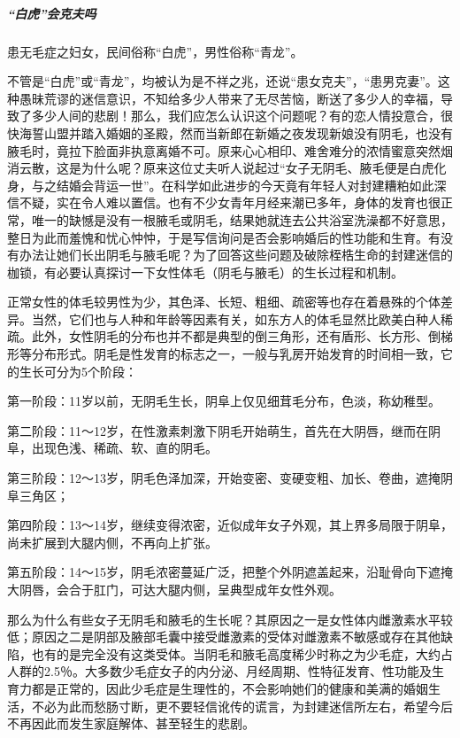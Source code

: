 \begin{enumerate}
\subparagraph{“白虎”会克夫吗}

患无毛症之妇女，民间俗称“白虎”，男性俗称“青龙”。

不管是“白虎”或“青龙”，均被认为是不祥之兆，还说“患女克夫”，“患男克妻”。这种愚昧荒谬的迷信意识，不知给多少人带来了无尽苦恼，断送了多少人的幸福，导致了多少人间的悲剧！那么，我们应怎么认识这个问题呢？有的恋人情投意合，很快海誓山盟并踏入婚姻的圣殿，然而当新郎在新婚之夜发现新娘没有阴毛，也没有腋毛时，竟拉下脸面非执意离婚不可。原来心心相印、难舍难分的浓情蜜意突然烟消云散，这是为什么呢？原来这位丈夫听人说起过“女子无阴毛、腋毛便是白虎化身，与之结婚会背运一世”。在科学如此进步的今天竟有年轻人对封建糟粕如此深信不疑，实在令人难以置信。也有不少女青年月经来潮已多年，身体的发育也很正常，唯一的缺憾是没有一根腋毛或阴毛，结果她就连去公共浴室洗澡都不好意思，整日为此而羞愧和忧心忡忡，于是写信询问是否会影响婚后的性功能和生育。有没有办法让她们长出阴毛与腋毛呢？为了回答这些问题及破除桎梏生命的封建迷信的枷锁，有必要认真探讨一下女性体毛（阴毛与腋毛）的生长过程和机制。

正常女性的体毛较男性为少，其色泽、长短、粗细、疏密等也存在着悬殊的个体差异。当然，它们也与人种和年龄等因素有关，如东方人的体毛显然比欧美白种人稀疏。此外，女性阴毛的分布也并不都是典型的倒三角形，还有盾形、长方形、倒梯形等分布形式。阴毛是性发育的标志之一，一般与乳房开始发育的时间相一致，它的生长可分为5个阶段：

第一阶段：11岁以前，无阴毛生长，阴阜上仅见细茸毛分布，色淡，称幼稚型。

第二阶段：11～12岁，在性激素刺激下阴毛开始萌生，首先在大阴唇，继而在阴阜，出现色浅、稀疏、软、直的阴毛。

第三阶段：12～13岁，阴毛色泽加深，开始变密、变硬变粗、加长、卷曲，遮掩阴阜三角区；

第四阶段：13～14岁，继续变得浓密，近似成年女子外观，其上界多局限于阴阜，尚未扩展到大腿内侧，不再向上扩张。

第五阶段：14～15岁，阴毛浓密蔓延广泛，把整个外阴遮盖起来，沿耻骨向下遮掩大阴唇，会合于肛门，可达大腿内侧，呈典型成年女性外观。

那么为什么有些女子无阴毛和腋毛的生长呢？其原因之一是女性体内雌激素水平较低；原因之二是阴部及腋部毛囊中接受雌激素的受体对雌激素不敏感或存在其他缺陷，也有的是完全没有这类受体。当阴毛和腋毛高度稀少时称之为少毛症，大约占人群的2.5％。大多数少毛症女子的内分泌、月经周期、性特征发育、性功能及生育力都是正常的，因此少毛症是生理性的，不会影响她们的健康和美满的婚姻生活，不必为此而愁肠寸断，更不要轻信讹传的谎言，为封建迷信所左右，希望今后不再因此而发生家庭解体、甚至轻生的悲剧。


\end{enumerate}
